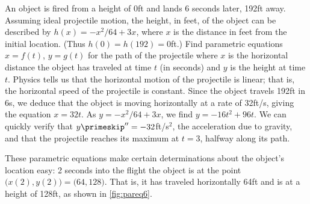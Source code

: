 \begin{example}\label{ex_pareq6}
An object is fired from a height of 0ft and lands 6 seconds later, 192ft away. Assuming ideal projectile motion, the height, in feet, of the object can be described by $h(x) = -x^2/64+3x$, where $x$ is the distance in feet from the initial location. (Thus $h(0) = h(192) = 0$ft.) Find parametric equations $x=f(t)$, $y=g(t)$ for the path of the projectile where $x$ is the horizontal distance the object has traveled at time $t$ (in seconds) and $y$ is the height at time $t$.
\solution
Physics tells us that the horizontal motion of the projectile is linear; that is, the horizontal speed of the projectile is constant. Since the object travels 192ft in 6s, we deduce that the object is moving horizontally at a rate of 32ft/s, giving the equation $x=32t$. As $y=-x^2/64+3x$, we find $y= -16t^2+96t$. We can quickly verify that $y\primeskip''=-32$ft/s$^2$, the acceleration due to gravity, and that the projectile reaches its maximum at $t=3$, halfway along its path.


These parametric equations make certain determinations about the object's location easy: 2 seconds into the flight the object is at the point $\bigl(x(2),y(2)\bigr) = \bigl(64,128\bigr)$. That is, it has traveled horizontally 64ft and is at a height of 128ft, as shown in \autoref{fig:pareq6}.
\end{example}

